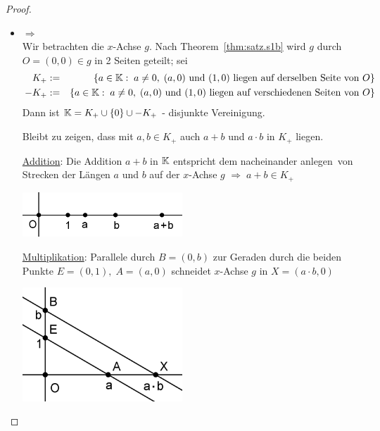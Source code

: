  
\begin{proof}
\begin{itemize}
\item
\glqq{}$\Longrightarrow$\grqq{}\\
Wir betrachten die $x$-Achse $g$.
Nach Theorem~\ref{thm:satz.s1b} wird $g$ durch
$O=(0,0)\in g$ in 2 Seiten geteilt; sei
\begin{eqnarray*}
K_+ & := & \{a\in \mathbb K:\;a\neq 0,\;(a,0)\mbox{ und }(1,0) \mbox{ liegen
auf derselben Seite von }O\}\\
-K_+ & := & \{a\in \mathbb K:\;a\neq 0,\;(a,0)\mbox{ und }(1,0) \mbox{
liegen auf verschiedenen Seiten von }O\}
\end{eqnarray*}
Dann ist $\mathbb K=K_+\cup\{0\}\cup -K_+$ - disjunkte Vereinigung.

Bleibt zu zeigen, dass mit $a,b\in K_+$ auch $a+b$ und $a\cdot b$ in
$K_+$ liegen.

\underline{Addition}: Die Addition $a+b$ in $\mathbb K$ entspricht dem
nacheinander \glqq anlegen\grqq\ von Strecken der Längen $a$ und $b$
auf der $x$-Achse $g$
$\Rightarrow\;a+b\in K_+$


\centerline{\includegraphics[width=6cm]{BILDER/1-1-16a-Satz.png}}



\underline{Multiplikation}: Parallele durch $B=(0,b)$ zur
Geraden durch die beiden Punkte $E=(0,1),\;A=(a,0)$ schneidet
$x$-Achse $g$ in $X=(a\cdot b,0)$



\centerline{\includegraphics[width=6cm]{BILDER/1-1-16b-Satz.png}}



\end{itemize}
\end{proof}
